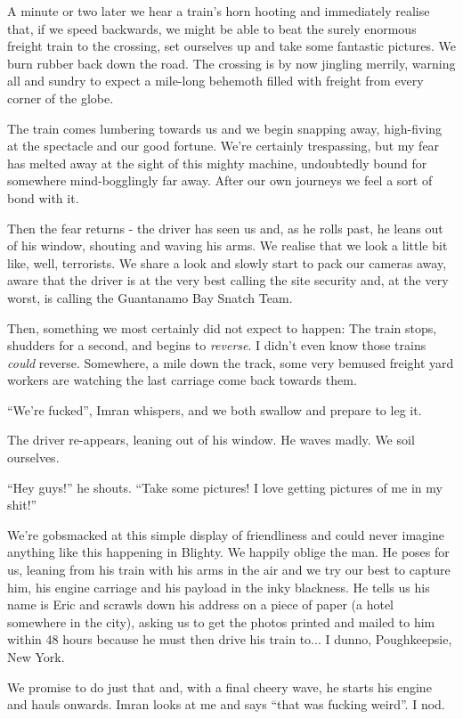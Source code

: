 \documentclass[a5paper,titlepage,11pt]{book}
\begin{document}
A minute or two later we hear a train's horn hooting and immediately realise that, if we speed backwards, we might be able to beat the surely enormous freight train to the crossing, set ourselves up and take some fantastic pictures. We burn rubber back down the road. The crossing is by now jingling merrily, warning all and sundry to expect a mile-long behemoth filled with freight from every corner of the globe.

The train comes lumbering towards us and we begin snapping away, high-fiving at the spectacle and our good fortune. We're certainly trespassing, but my fear has melted away at the sight of this mighty machine, undoubtedly bound for somewhere mind-bogglingly far away. After our own journeys we feel a sort of bond with it.

Then the fear returns - the driver has seen us and, as he rolls past, he leans out of his window, shouting and waving his arms. We realise that we look a little bit like, well, terrorists. We share a look and slowly start to pack our cameras away, aware that the driver is at the very best calling the site security and, at the very worst, is calling the Guantanamo Bay Snatch Team.

Then, something we most certainly did not expect to happen:  The train stops, shudders for a second, and begins to \emph{reverse}. I didn't even know those trains \emph{could} reverse. Somewhere, a mile down the track, some very bemused freight yard workers are watching the last carriage come back towards them.

``We're fucked'', Imran whispers, and we both swallow and prepare to leg it.

The driver re-appears, leaning out of his window. He waves madly. We soil ourselves.

``Hey guys!'' he shouts. ``Take some pictures!  I love getting pictures of me in my shit!''

We're gobsmacked at this simple display of friendliness and could never imagine anything like this happening in Blighty. We happily oblige the man. He poses for us, leaning from his train with his arms in the air and we try our best to capture him, his engine carriage and his payload in the inky blackness. He tells us his name is Eric and scrawls down his address on a piece of paper (a hotel somewhere in the city), asking us to get the photos printed and mailed to him within 48 hours because he must then drive his train to... I dunno, Poughkeepsie, New York.

We promise to do just that and, with a final cheery wave, he starts his engine and hauls onwards. Imran looks at me and says ``that was fucking weird''. I nod.
\end{document}

